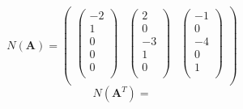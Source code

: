 \documentclass[times, 12pt]{article}
\begin{document}
\begin{description}
$$N(\textbf{A}) = \left(
                    \begin{array}{ccc}
                      \left(
                        \begin{array}{c}
                          -2 \\
                          1 \\
                          0 \\
                          0 \\
                          0 \\
                        \end{array}
                      \right)
                       & \left(
                           \begin{array}{c}
                             2 \\
                             0 \\
                             -3 \\
                             1 \\
                             0 \\
                           \end{array}
                         \right)
                        & \left(
                            \begin{array}{c}
                              -1 \\
                              0 \\
                              -4 \\
                              0 \\
                              1 \\
                            \end{array}
                          \right)
                         \\
                    \end{array}
                  \right)
$$
$$N(\textbf{A}^T) = $$
\end{description}
\end{document}
